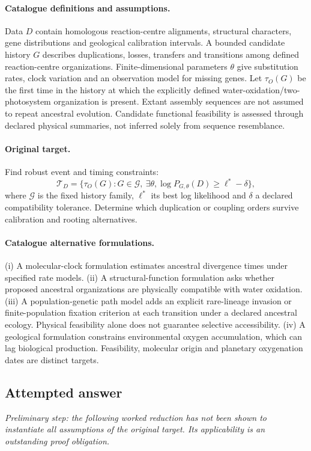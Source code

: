 \documentclass[11pt]{article}
\begin{document}
\paragraph{Catalogue definitions and assumptions.}
Data $D$ contain homologous reaction-centre alignments, structural characters, gene distributions and geological calibration intervals. A bounded candidate history $G$ describes duplications, losses, transfers and transitions among defined reaction-centre organizations. Finite-dimensional parameters $\theta$ give substitution rates, clock variation and an observation model for missing genes. Let $\tau_O(G)$ be the first time in the history at which the explicitly defined water-oxidation/two-photosystem organization is present. Extant assembly sequences are not assumed to repeat ancestral evolution. Candidate functional feasibility is assessed through declared physical summaries, not inferred solely from sequence resemblance.
\paragraph{Original target.}
Find robust event and timing constraints:
    \[\mathcal T_D=\{\tau_O(G):G\in\mathcal G,\ \exists\theta,
    \log P_{G,\theta}(D)\geq\ell^*-\delta\},\]
    where $\mathcal G$ is the fixed history family, $\ell^*$ its best log likelihood and $\delta$ a declared compatibility tolerance. Determine which duplication or coupling orders survive calibration and rooting alternatives.
\paragraph{Catalogue alternative formulations.}
(i) A molecular-clock formulation estimates ancestral divergence times under specified rate models. (ii) A structural-function formulation asks whether proposed ancestral organizations are physically compatible with water oxidation. (iii) A population-genetic path model adds an explicit rare-lineage invasion or finite-population fixation criterion at each transition under a declared ancestral ecology. Physical feasibility alone does not guarantee selective accessibility. (iv) A geological formulation constrains environmental oxygen accumulation, which can lag biological production. Feasibility, molecular origin and planetary oxygenation dates are distinct targets.
\subsection{Attempted answer}
\noindent\emph{Preliminary step: the following worked reduction has not been shown to instantiate all assumptions of the original target. Its applicability is an outstanding proof obligation.}
\end{document}
